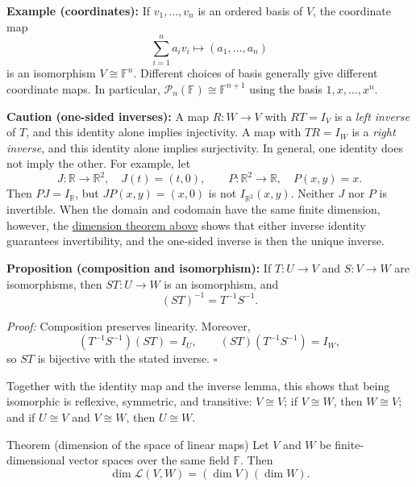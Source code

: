 \documentclass[a4paper,11pt,abstract=true]{scrartcl}
\theoremstyle{dotlessP}
\theoremstyle{dotlessS}
\theoremstyle{remark}
\theoremstyle{definition}
\begin{document}
\begin{example_box}
\textbf{Example (coordinates):} If $v_1,\ldots,v_n$ is an ordered
basis of $V$, the coordinate map
\[
\sum_{i=1}^n a_i v_i\longmapsto(a_1,\ldots,a_n)
\]
is an isomorphism $V\cong\mathbb{F}^n$. Different choices of basis
generally give different coordinate maps. In particular,
$\mathcal{P}_n(\mathbb{F})\cong\mathbb{F}^{n+1}$ using the basis
$1,x,\ldots,x^n$.
\end{example_box}

\begin{remark_box}
\textbf{Caution (one-sided inverses):} A map $R:W\longrightarrow V$
with $RT=I_V$ is a \emph{left inverse} of $T$, and this identity alone
implies injectivity. A map with $TR=I_W$ is a \emph{right inverse},
and this identity alone implies surjectivity. In general, one identity
does not imply the other. For example, let
\[
J:\mathbb{R}\longrightarrow\mathbb{R}^2,\quad J(t)=(t,0),
\qquad P:\mathbb{R}^2\longrightarrow\mathbb{R},\quad P(x,y)=x.
\]
Then $PJ=I_{\mathbb{R}}$, but $JP(x,y)=(x,0)$ is not
$I_{\mathbb{R}^2}(x,y)$. Neither $J$ nor $P$ is invertible.
When the domain and codomain have the same finite dimension, however,
the \hyperref[thm:dimension-criteria]{dimension theorem above} shows that
either inverse identity guarantees
invertibility, and the one-sided inverse is then the unique inverse.
\end{remark_box}

\begin{claim_box}
\textbf{Proposition (composition and isomorphism):} If
$T:U\longrightarrow V$ and $S:V\longrightarrow W$ are isomorphisms, then
$ST:U\longrightarrow W$ is an isomorphism, and
\[
{(ST)}^{-1}=T^{-1}S^{-1}.
\]

\textit{Proof:} Composition preserves linearity. Moreover,
\[
(T^{-1}S^{-1})(ST)=I_U,
\qquad (ST)(T^{-1}S^{-1})=I_W,
\]
so $ST$ is bijective with the stated inverse. \hfill$\square$

Together with the identity map and the inverse lemma, this shows that
being isomorphic is reflexive, symmetric, and transitive: $V\cong V$;
if $V\cong W$, then $W\cong V$; and if $U\cong V$ and $V\cong W$,
then $U\cong W$.
\end{claim_box}

\begin{mainbox}{Theorem (dimension of the space of linear maps)}
Let
$V$ and $W$ be finite-dimensional vector spaces over the same field
$\mathbb{F}$. Then
\[
\dim\mathcal{L}(V,W)=(\dim V)(\dim W).
\]
\end{mainbox}
\end{document}
